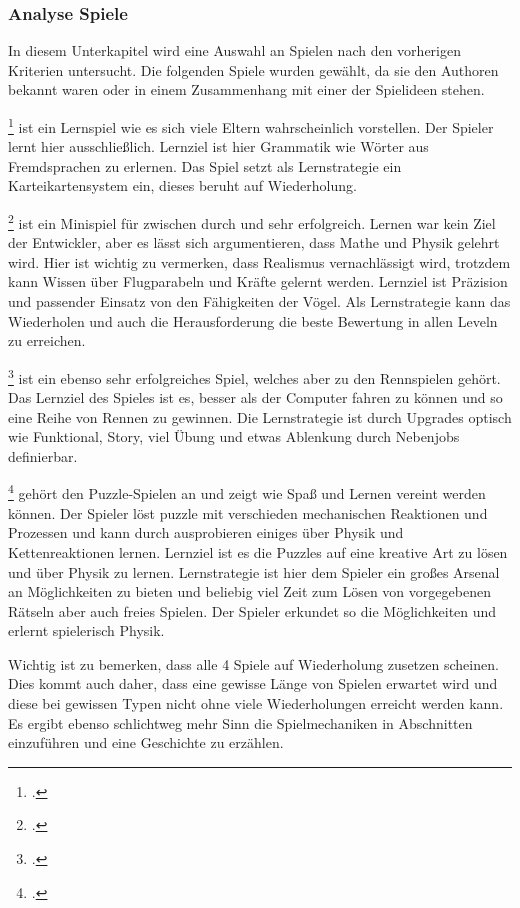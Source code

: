 	\subsubsection{Analyse Spiele}\label{sssec:lernspielanalyse}
		In diesem Unterkapitel wird eine Auswahl an Spielen nach den vorherigen Kriterien untersucht. Die folgenden Spiele wurden gewählt, da sie den Authoren bekannt waren oder in einem Zusammenhang mit einer der Spielideen stehen.
		\begin{description}\obeylines
			\item[Gut]{
				\footcite{game-gut} ist ein Lernspiel wie es sich viele Eltern wahrscheinlich vorstellen. Der Spieler lernt hier ausschließlich.
				Lernziel ist hier Grammatik wie Wörter aus Fremdsprachen zu erlernen.
				Das Spiel setzt als Lernstrategie ein Karteikartensystem ein, dieses beruht auf Wiederholung.
			}
			\item[Angry Birds]{
				\footcite{game-angrybirds} ist ein Minispiel für zwischen durch und sehr erfolgreich. Lernen war kein Ziel der Entwickler, aber es lässt sich argumentieren, dass Mathe und Physik gelehrt wird. Hier ist wichtig zu vermerken, dass Realismus vernachlässigt wird, trotzdem kann Wissen über Flugparabeln und Kräfte gelernt werden.
				Lernziel ist Präzision und passender Einsatz von den Fähigkeiten der Vögel.
				Als Lernstrategie kann das Wiederholen und auch die Herausforderung die beste Bewertung in allen Leveln zu erreichen.
			}
			\item[Need for Speed]{
				\footcite{game-nfs} ist ein ebenso sehr erfolgreiches Spiel, welches aber zu den Rennspielen gehört.
				Das Lernziel des Spieles ist es, besser als der Computer fahren zu können und so eine Reihe von Rennen zu gewinnen.
				Die Lernstrategie ist durch Upgrades optisch wie Funktional, Story, viel Übung und etwas Ablenkung durch Nebenjobs definierbar.
			}
			\item[Crazy Machines]{
				\footcite{game-crazymachine} gehört den Puzzle-Spielen an und zeigt wie Spaß und Lernen vereint werden können. Der Spieler löst puzzle mit verschieden mechanischen Reaktionen und Prozessen und kann durch ausprobieren einiges über Physik und Kettenreaktionen lernen.
				Lernziel ist es die Puzzles auf eine kreative Art zu lösen und über Physik zu lernen.
				Lernstrategie ist hier dem Spieler ein großes Arsenal an Möglichkeiten zu bieten und beliebig viel Zeit zum Lösen von vorgegebenen Rätseln aber auch freies Spielen. Der Spieler erkundet so die Möglichkeiten und erlernt spielerisch Physik.
			}
		\end{description}
		Wichtig ist zu bemerken, dass alle 4 Spiele auf Wiederholung zusetzen scheinen. Dies kommt auch daher, dass eine gewisse Länge von Spielen erwartet wird und diese bei gewissen Typen nicht ohne viele Wiederholungen erreicht werden kann. Es ergibt ebenso schlichtweg mehr Sinn die Spielmechaniken in Abschnitten einzuführen und eine Geschichte zu erzählen.
